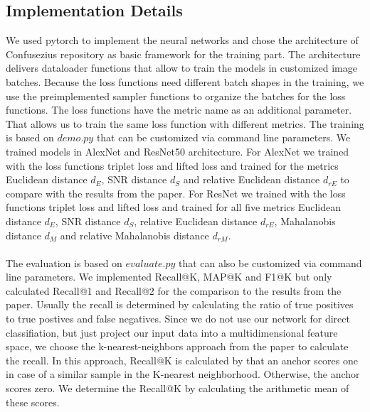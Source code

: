 \documentclass[12pt,paper=a4]{scrartcl}
\theoremstyle{break}
\begin{document}
\subsection{Implementation Details}
We used pytorch to implement the neural networks and chose the architecture of Confusezius repository \cite{confusezius} as basic framework for the training part. The architecture delivers dataloader functions that allow to train the models in customized image batches. Because the loss functions need different batch shapes in the training, we use the preimplemented sampler functions to organize the batches for the loss functions. The loss functions have the metric name as an additional parameter. That allows us to train the same loss function with different metrics. The training is based on $demo.py$ that can be customized via command line parameters. We trained models in AlexNet and ResNet50 architecture. For AlexNet we trained with the loss functions triplet loss and lifted loss and trained for the metrics Euclidean distance $d_E$, SNR distance $d_S$ and relative Euclidean distance $d_{rE}$ to compare with the results from the paper. For ResNet we trained with the loss functions triplet loss and lifted loss and trained for all five metrics Euclidean distance $d_E$, SNR distance $d_S$, relative Euclidean distance $d_{rE}$, Mahalanobis distance $d_M$ and relative Mahalanobis distance $d_{rM}$. \\ \\
The evaluation is based on $evaluate.py$ that can also be customized via command line parameters. We implemented Recall@K, MAP@K and F1@K but only calculated Recall@1 and Recall@2 for the comparison to the results from the paper. Usually the recall is determined by calculating the ratio of true positives to true postives and false negatives. Since we do not use our network for direct classifiation, but just project our input data into a multidimensional feature space, we choose the k-nearest-neighbors approach from the paper to calculate the recall. In this approach, Recall@K is calculated by that an anchor scores one in case of a similar sample in the K-nearest neighborhood. Otherwise, the anchor scores zero. We determine the Recall@K by calculating the arithmetic mean of these scores.
\end{document}
